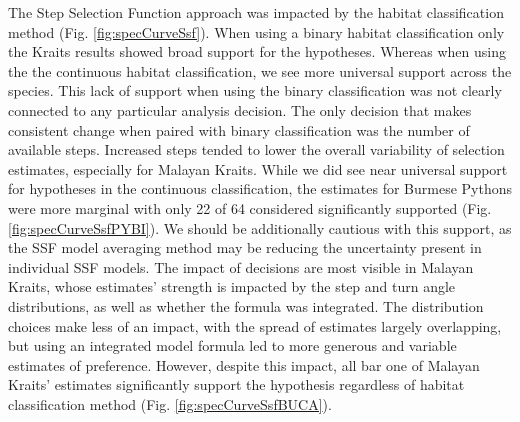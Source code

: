 \documentclass[10pt,a4paper]{article}
\begin{document}
The Step Selection Function approach was impacted by the habitat classification method (Fig. \ref{fig:specCurveSsf}).
When using a binary habitat classification only the Kraits results showed broad support for the hypotheses.
Whereas when using the the continuous habitat classification, we see more universal support across the species.
This lack of support when using the binary classification was not clearly connected to any particular analysis decision.
The only decision that makes consistent change when paired with binary classification was the number of available steps.
Increased steps tended to lower the overall variability of selection estimates, especially for Malayan Kraits.
While we did see near universal support for hypotheses in the continuous classification, the estimates for Burmese Pythons were more marginal with only 22 of 64 considered significantly supported (Fig. \ref{fig:specCurveSsfPYBI}).
We should be additionally cautious with this support, as the SSF model averaging method may be reducing the uncertainty present in individual SSF models.
The impact of decisions are most visible in Malayan Kraits, whose estimates' strength is impacted by the step and turn angle distributions, as well as whether the formula was integrated.
The distribution choices make less of an impact, with the spread of estimates largely overlapping, but using an integrated model formula led to more generous and variable estimates of preference.
However, despite this impact, all bar one of Malayan Kraits' estimates significantly support the hypothesis regardless of habitat classification method (Fig. \ref{fig:specCurveSsfBUCA}).
\end{document}
